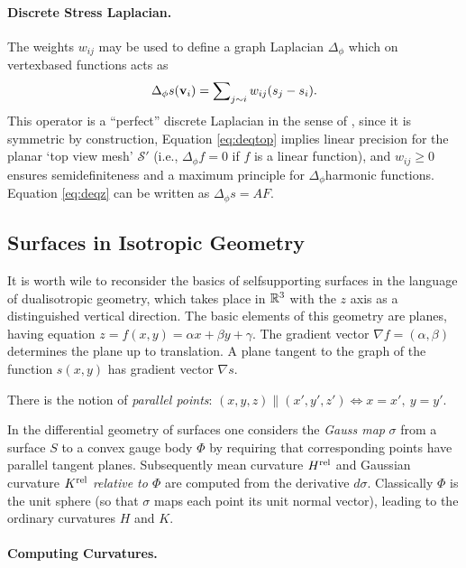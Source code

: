\documentclass[annual]{acmsiggraph}
\def\rel{{\mathord{\text{\rm rel}}}}
\def\SS{{\mathcal S}}
\begin{document}
\paragraph{Discrete Stress Laplacian.}

The weights $w_{ij}$ may be used to define a graph
Laplacian $\Delta_\phi$ which on vertex\dash based functions acts as
	$$\Delta_{\phi} s({\mathbf v}_i)=\sum\nolimits_{j\sim i} w_{ij}(s_j-s_i).$$
 This operator is a ``perfect'' discrete Laplacian in the sense
of \cite{wardetzky07}, since it is symmetric
by construction, Equation \eqref{eq:deqtop} implies linear
precision for the planar `top view mesh' $\SS'$ (i.e., $\Delta_\phi f=0$
if $f$ is a linear function), and $w_{ij}\ge 0$ ensures semidefiniteness
and a maximum principle for $\Delta_\phi$\dash harmonic
functions. Equation \eqref{eq:deqz} can be written as $\Delta_\phi s = AF$.

\subsection{Surfaces in Isotropic Geometry} \label{sec:smooth}

It is worth wile to reconsider the basics of self\dash supporting surfaces
in the language of dual\dash isotropic geometry, which takes place in
${\mathbb R}^3$ with the $z$ axis as a distinguished vertical direction. The basic
elements of this geometry are planes, having equation $z=f(x,y) = \alpha
x+\beta y+\gamma$. The gradient vector $\nabla f = (\alpha,\beta)$
determines the plane up to translation. A plane tangent to the graph of
the function $s(x,y)$ has gradient vector $\nabla s$.

There is the notion of {\em parallel points}:
	$
	(x,y,z) \parallel (x',y',z') \iff
	x=x',\ y=y'
	.$

In the differential geometry of surfaces one considers the {\em Gauss map}
$\sigma$ from a surface $S$ to a convex gauge body $\Phi$ by requiring
that corresponding points have parallel tangent planes.  Subsequently mean
curvature $H^\rel$ and Gaussian curvature $K^\rel$ {\em relative to
$\Phi$} are computed from the derivative $d\sigma$. Classically $\Phi$ is
the unit sphere (so that $\sigma$ maps each point its unit normal vector),
leading to the ordinary curvatures $H$ and $K$.


\paragraph{Computing Curvatures.}
\end{document}
